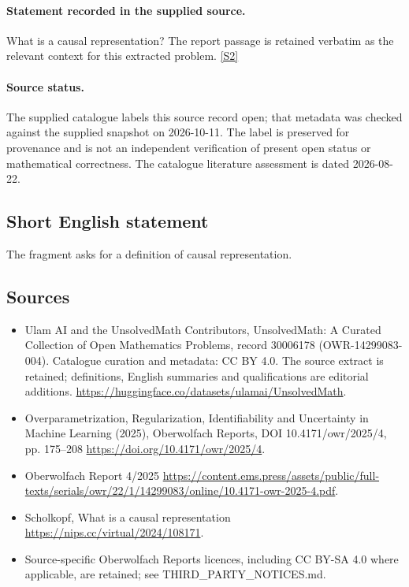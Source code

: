 \documentclass[11pt]{article}
\begin{document}
\paragraph{Statement recorded in the supplied source.}
What is a causal representation? The report passage is retained verbatim as the relevant context for this extracted problem. \href{https://doi.org/10.4171/owr/2025/4}{[S2]}
\paragraph{Source status.}
The supplied catalogue labels this source record open; that metadata was checked against the supplied snapshot on 2026-10-11. The label is preserved for provenance and is not an independent verification of present open status or mathematical correctness. The catalogue literature assessment is dated 2026-08-22.
\subsection{Short English statement}
The fragment asks for a definition of causal representation.
\subsection{Sources}
\begin{itemize}
\item[S1] Ulam AI and the UnsolvedMath Contributors, UnsolvedMath: A Curated Collection of Open Mathematics Problems, record 30006178 (OWR-14299083-004). Catalogue curation and metadata: CC BY 4.0. The source extract is retained; definitions, English summaries and qualifications are editorial additions.
\url{https://huggingface.co/datasets/ulamai/UnsolvedMath}.
\item[S2] Overparametrization, Regularization, Identifiability and Uncertainty in Machine Learning (2025), Oberwolfach Reports, DOI 10.4171/owr/2025/4, pp. 175--208
\url{https://doi.org/10.4171/owr/2025/4}.
\item[S3] Oberwolfach Report 4/2025
\url{https://content.ems.press/assets/public/full-texts/serials/owr/22/1/14299083/online/10.4171-owr-2025-4.pdf}.
\item[S4] Scholkopf, What is a causal representation
\url{https://nips.cc/virtual/2024/108171}.
\item Source-specific Oberwolfach Reports licences, including CC BY-SA 4.0 where applicable, are retained; see THIRD\_PARTY\_NOTICES.md.
\end{itemize}
\end{document}
